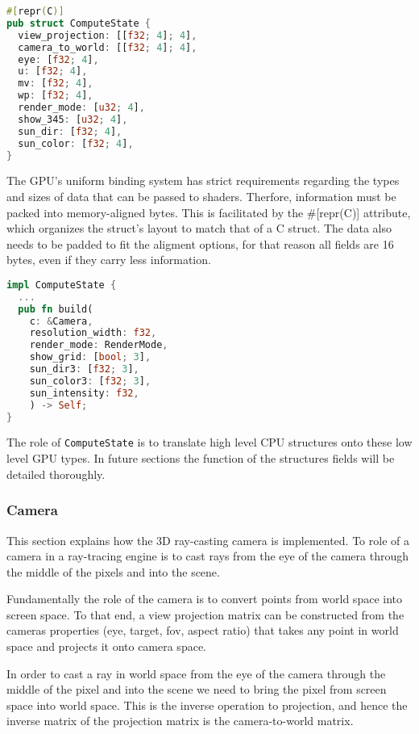 \begin{lstlisting}[language=Rust]
#[repr(C)]
pub struct ComputeState {
  view_projection: [[f32; 4]; 4],
  camera_to_world: [[f32; 4]; 4],
  eye: [f32; 4],
  u: [f32; 4],
  mv: [f32; 4],
  wp: [f32; 4],
  render_mode: [u32; 4],
  show_345: [u32; 4],
  sun_dir: [f32; 4],
  sun_color: [f32; 4],
}
\end{lstlisting}

The GPU's uniform binding system has strict requirements regarding the types and sizes of data that can be passed to shaders. Therfore, information must be packed into memory-aligned bytes. This is facilitated by the #[repr(C)] attribute, which organizes the struct's layout to match that of a C struct. The data also needs to be padded to fit the aligment options, for that reason all fields are 16 bytes, even if they carry less information.

\begin{lstlisting}[language=rust,caption={\texttt{ComputeState} build method that transforms CPU data into GPU-ready data},captionpos=b,
  label={cstate:build}]
impl ComputeState {
  ...
  pub fn build(
    c: &Camera,
    resolution_width: f32,
    render_mode: RenderMode,
    show_grid: [bool; 3],
    sun_dir3: [f32; 3],
    sun_color3: [f32; 3],
    sun_intensity: f32,
    ) -> Self;
}
\end{lstlisting}

The role of \verb|ComputeState| is to translate high level CPU structures onto these low level GPU types. In future sections the function of the structures fields will be detailed thoroughly.

\subsubsection{Camera}

This section explains how the 3D ray-casting camera is implemented. To role of a camera in a ray-tracing engine is to cast rays from the eye of the camera through the middle of the pixels and into the scene.

Fundamentally the role of the camera is to convert points from world space into screen space. To that end, a view projection matrix can be constructed from the cameras properties (eye, target, \acrshort{fov}, aspect ratio) that takes any point in world space and projects it onto camera space.

In order to cast a ray in world space from the eye of the camera through the middle of the pixel and into the scene we need to bring the pixel from screen space into world space. This is the inverse operation to projection, and hence the inverse matrix of the projection matrix is the camera-to-world matrix.


